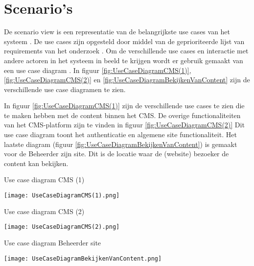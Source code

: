\section{Scenario's}
De scenario view is een representatie van de belangrijkste use cases van het systeem \parencite{4p1Model}.
De use cases zijn opgesteld door middel van de geprioriteerde lijst van requirements van het onderzoek \parencite{DanteOnderzoek}.
Om de verschillende use cases en interactie met andere actoren in het systeem in beeld te krijgen wordt er gebruik gemaakt van een use case diagram \parencite{UseCaseDiagram}.
In figuur \ref{fig:UseCaseDiagramCMS(1)}, \ref{fig:UseCaseDiagramCMS(2)} en \ref{fig:UseCaseDiagramBekijkenVanContent} zijn de verschillende use case diagramen te zien.

\whitespace[2]
In figuur \ref{fig:UseCaseDiagramCMS(1)} zijn de verschillende use cases te zien die te maken hebben met de content binnen het CMS.
De overige functionaliteiten van het CMS-platform zijn te vinden in figuur \ref{fig:UseCaseDiagramCMS(2)}
Dit use case diagram toont het authenticatie en algemene site functionaliteit.
Het laatste diagram (figuur \ref{fig:UseCaseDiagramBekijkenVanContent}) is gemaakt voor de \gls{Beheerder} zijn site.
Dit is de locatie waar de (website) bezoeker de content kan bekijken.

\whitespace[2]
\begin{graphic}
	\captionsetup{type=figure}
	\caption{Use case diagram CMS (1)}
	\texttt{[image: UseCaseDiagramCMS(1).png]}
	\label{fig:UseCaseDiagramCMS(1)}
\end{graphic}

\newpage
\begin{graphic}
	\captionsetup{type=figure}
	\caption{Use case diagram CMS (2)}
	\texttt{[image: UseCaseDiagramCMS(2).png]}
	\label{fig:UseCaseDiagramCMS(2)}
\end{graphic}

\whitespace
\begin{graphic}
	\captionsetup{type=figure}
    \caption{Use case diagram \gls{Beheerder} site}
	\texttt{[image: UseCaseDiagramBekijkenVanContent.png]}
	\label{fig:UseCaseDiagramBekijkenVanContent}
\end{graphic}
